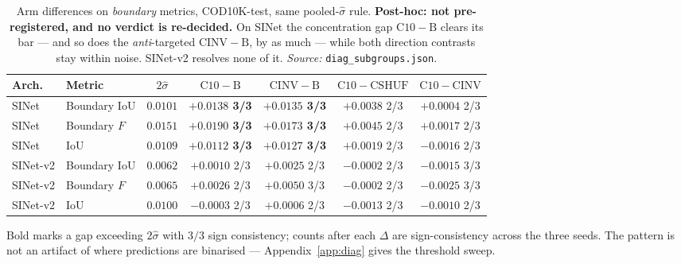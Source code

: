 \begin{table}[t]
\caption{Arm differences on \emph{boundary} metrics, COD10K-test, same pooled-$\hat{\sigma}$ rule. \textbf{Post-hoc: not pre-registered, and no verdict is re-decided.} On SINet the concentration gap $\mathrm{C10}-\mathrm{B}$ clears its bar --- and so does the \emph{anti}-targeted $\mathrm{CINV}-\mathrm{B}$, by as much --- while both direction contrasts stay within noise. SINet-v2 resolves none of it. \emph{Source:} \texttt{diag\_subgroups.json}.}
\label{tab:boundary}
\begin{center}
\footnotesize
\setlength{\tabcolsep}{3.5pt}
\begin{tabular}{@{}llccccc@{}}
\toprule
Arch. & Metric & $2\hat{\sigma}$ & $\mathrm{C10}\!-\!\mathrm{B}$ & $\mathrm{CINV}\!-\!\mathrm{B}$ & $\mathrm{C10}\!-\!\mathrm{CSHUF}$ & $\mathrm{C10}\!-\!\mathrm{CINV}$ \\
\midrule
SINet & Boundary IoU & $0.0101$ & \textbf{$+0.0138$ 3/3} & \textbf{$+0.0135$ 3/3} & $+0.0038$ 2/3 & $+0.0004$ 2/3 \\
SINet & Boundary $F$ & $0.0151$ & \textbf{$+0.0190$ 3/3} & \textbf{$+0.0173$ 3/3} & $+0.0045$ 2/3 & $+0.0017$ 2/3 \\
SINet & IoU & $0.0109$ & \textbf{$+0.0112$ 3/3} & \textbf{$+0.0127$ 3/3} & $+0.0019$ 2/3 & $-0.0016$ 2/3 \\
\midrule
SINet-v2 & Boundary IoU & $0.0062$ & $+0.0010$ 2/3 & $+0.0025$ 2/3 & $-0.0002$ 2/3 & $-0.0015$ 3/3 \\
SINet-v2 & Boundary $F$ & $0.0065$ & $+0.0026$ 2/3 & $+0.0050$ 3/3 & $-0.0002$ 2/3 & $-0.0025$ 3/3 \\
SINet-v2 & IoU & $0.0100$ & $-0.0003$ 2/3 & $+0.0006$ 2/3 & $-0.0013$ 2/3 & $-0.0010$ 2/3 \\
\bottomrule
\end{tabular}
\end{center}
\footnotesize Bold marks a gap exceeding $2\hat{\sigma}$ with $3/3$ sign consistency; counts after
each $\Delta$ are sign-consistency across the three seeds. The pattern is not an artifact of where
predictions are binarised --- Appendix~\ref{app:diag} gives the threshold sweep.
\end{table}
